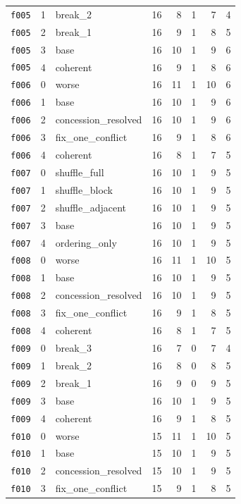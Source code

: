 \documentclass[11pt]{article}
\begin{document}
\begin{table}[htbp]
\begin{tabular}{lllrrrrr}
\texttt{f005} & 1 & break\_2 & 16 & 8 & 1 & 7 & 4 \\
\texttt{f005} & 2 & break\_1 & 16 & 9 & 1 & 8 & 5 \\
\texttt{f005} & 3 & base & 16 & 10 & 1 & 9 & 6 \\
\texttt{f005} & 4 & coherent & 16 & 9 & 1 & 8 & 6 \\
\texttt{f006} & 0 & worse & 16 & 11 & 1 & 10 & 6 \\
\texttt{f006} & 1 & base & 16 & 10 & 1 & 9 & 6 \\
\texttt{f006} & 2 & concession\_resolved & 16 & 10 & 1 & 9 & 6 \\
\texttt{f006} & 3 & fix\_one\_conflict & 16 & 9 & 1 & 8 & 6 \\
\texttt{f006} & 4 & coherent & 16 & 8 & 1 & 7 & 5 \\
\texttt{f007} & 0 & shuffle\_full & 16 & 10 & 1 & 9 & 5 \\
\texttt{f007} & 1 & shuffle\_block & 16 & 10 & 1 & 9 & 5 \\
\texttt{f007} & 2 & shuffle\_adjacent & 16 & 10 & 1 & 9 & 5 \\
\texttt{f007} & 3 & base & 16 & 10 & 1 & 9 & 5 \\
\texttt{f007} & 4 & ordering\_only & 16 & 10 & 1 & 9 & 5 \\
\texttt{f008} & 0 & worse & 16 & 11 & 1 & 10 & 5 \\
\texttt{f008} & 1 & base & 16 & 10 & 1 & 9 & 5 \\
\texttt{f008} & 2 & concession\_resolved & 16 & 10 & 1 & 9 & 5 \\
\texttt{f008} & 3 & fix\_one\_conflict & 16 & 9 & 1 & 8 & 5 \\
\texttt{f008} & 4 & coherent & 16 & 8 & 1 & 7 & 5 \\
\texttt{f009} & 0 & break\_3 & 16 & 7 & 0 & 7 & 4 \\
\texttt{f009} & 1 & break\_2 & 16 & 8 & 0 & 8 & 5 \\
\texttt{f009} & 2 & break\_1 & 16 & 9 & 0 & 9 & 5 \\
\texttt{f009} & 3 & base & 16 & 10 & 1 & 9 & 5 \\
\texttt{f009} & 4 & coherent & 16 & 9 & 1 & 8 & 5 \\
\texttt{f010} & 0 & worse & 15 & 11 & 1 & 10 & 5 \\
\texttt{f010} & 1 & base & 15 & 10 & 1 & 9 & 5 \\
\texttt{f010} & 2 & concession\_resolved & 15 & 10 & 1 & 9 & 5 \\
\texttt{f010} & 3 & fix\_one\_conflict & 15 & 9 & 1 & 8 & 5 \\

\end{tabular}
\end{table}
\end{document}
